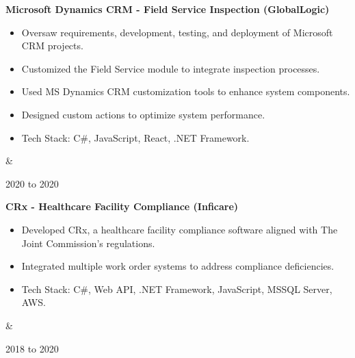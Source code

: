 \documentclass[10pt, letterpaper]{article}
\newenvironment{highlights}{
        \begin{itemize}[
                topsep=0pt,
                parsep=0.10cm,
                partopsep=0pt,
                itemsep=0pt,
                after=\vspace{-1\baselineskip},
                leftmargin=0.4cm + 3pt
            ]
    }{
        \end{itemize}
    } %
\let\originalTabularx\tabularx
\let\originalEndTabularx\endtabularx
\renewenvironment{tabularx}{\bgroup\centering\originalTabularx}{\originalEndTabularx\par\egroup}
\begin{document}
        \vspace{0.2cm}
        \begin{tabularx}{
            \textwidth-0.4 cm-0.13cm
        }{
            K{0.2cm}
            R{4.1cm}
        }
            \textbf{Microsoft Dynamics CRM - Field Service Inspection (GlobalLogic)}

            \vspace{0.10cm}

            \begin{highlights}
                \item Oversaw requirements, development, testing, and deployment of Microsoft CRM projects.
                \item Customized the Field Service module to integrate inspection processes.
                \item Used MS Dynamics CRM customization tools to enhance system components.
                \item Designed custom actions to optimize system performance.
                \item Tech Stack: C\#, JavaScript, React, .NET Framework.
            \end{highlights}
            &
            

            2020 to 2020
        \end{tabularx}


        \vspace{0.2cm}
        \begin{tabularx}{
            \textwidth-0.4 cm-0.13cm
        }{
            K{0.2cm}
            R{4.1cm}
        }
            \textbf{CRx - Healthcare Facility Compliance (Inficare)}

            \vspace{0.10cm}

            \begin{highlights}
                \item Developed CRx, a healthcare facility compliance software aligned with The Joint Commission's regulations.
                \item Integrated multiple work order systems to address compliance deficiencies.
                \item Tech Stack: C\#, Web API, .NET Framework, JavaScript, MSSQL Server, AWS.
            \end{highlights}
            &
            

            2018 to 2020
        \end{tabularx}
\end{document}
